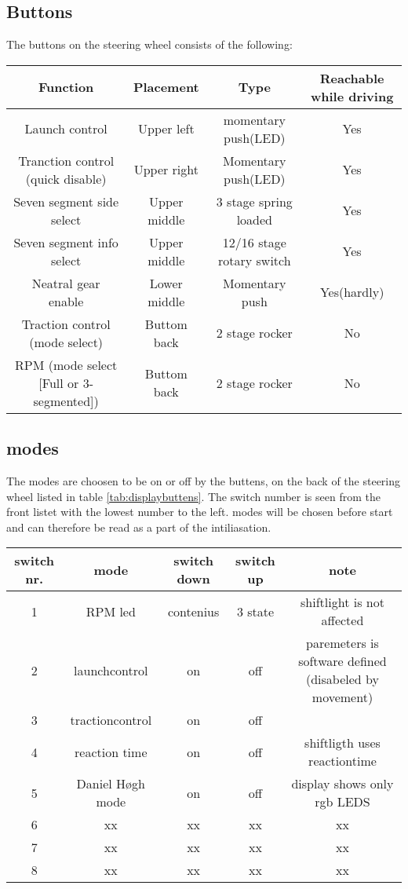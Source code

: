 \subsection*{Buttons}
The buttons on the steering wheel consists of the following:
\begin{center}
\footnotesize
  \begin{tabular}{| c | c | c | c |}
    \hline
    Function & Placement & Type & Reachable while driving  \\ \hline
    Launch control & Upper left & momentary push(LED) & Yes\\ \hline
    Tranction control (quick disable) & Upper right & Momentary push(LED) & Yes\\ \hline
    Seven segment side select & Upper middle & 3 stage spring loaded & Yes\\ \hline
    Seven segment info select & Upper middle & 12/16 stage rotary switch & Yes\\ \hline
    Neatral gear enable & Lower middle & Momentary push & Yes(hardly)\\ \hline
    Traction control (mode select) & Buttom back & 2 stage rocker & No\\ \hline
    RPM (mode select [Full or 3-segmented]) & Buttom back & 2 stage rocker & No\\ \hline

  \end{tabular}
  \label{tab:displaybuttens}  
\end{center}

\subsection*{modes}
The modes are choosen to be on or off by the buttens, on the back of the steering wheel listed in table \ref{tab:displaybuttens}. The switch number is seen from the front listet with the lowest number to the left.
modes will be chosen before start and can therefore be read as a part of the intiliasation.   
\begin{center}
\footnotesize
  \begin{tabular}{| c | c | c | c | c |}
    \hline
    switch nr. & mode      & switch down   & switch up & note  \\ \hline
    1 & RPM led         & contenius & 3 state       & shiftlight is not affected \\ \hline
    2 & launchcontrol   & on        & off           & paremeters is software defined (disabeled by movement) \\ \hline
    3 & tractioncontrol & on        & off           &   \\ \hline
    4 & reaction time   & on        & off           & shiftligth uses reactiontime \\ \hline
    5 & Daniel Høgh mode & on       & off           & display shows only rgb LEDS \\ \hline
    6 & xx & xx & xx & xx \\ \hline
    7 & xx & xx & xx & xx \\ \hline
    8 & xx & xx & xx & xx \\ \hline
  \end{tabular}
\end{center}

 